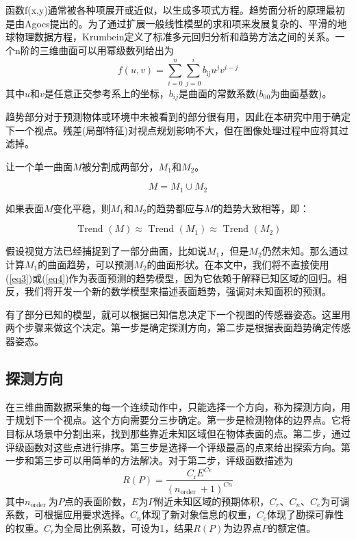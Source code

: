 \documentclass[AutoFakeBold,zihao=-4]{ctexart}
\begin{document}
	函数f(x,y)通常被各种项展开或近似，以生成多项式方程。趋势面分析的原理最初是由Agocs\cite{agocs1951least}提出的。为了通过扩展一般线性模型的求和项来发展复杂的、平滑的地球物理数据方程，Krumbein\cite{krumbein1959sorting}定义了标准多元回归分析和趋势方法之间的关系。一个n阶的三维曲面可以用幂级数列给出为
	\begin{equation}
		f(u, v)=\sum_{i=0}^{n} \sum_{j=0}^{i} b_{\mathrm{ij}} u^{j} v^{i-j}
		\label{eq4}
	\end{equation}
	其中$ u $和$ v $是任意正交参考系上的坐标，$ b_{ij} $是曲面的常数系数($ b_{00} $为曲面基数)。
	
	趋势部分对于预测物体或环境中未被看到的部分很有用，因此在本研究中用于确定下一个视点。残差(局部特征)对视点规划影响不大，但在图像处理过程中应将其过滤掉。
	
	让一个单一曲面$ M $被分割成两部分，$ M_{1} $和$ M_{2} $。
	
	\begin{equation*}
		M=M_{1} \cup M_{2}
	\end{equation*}

	如果表面$ M $变化平稳，则$ M_{1} $和$ M_{2} $的趋势都应与$ M $的趋势大致相等，即：
	
	\begin{equation}
		\text { Trend }(M) \approx \text { Trend }\left(M_{1}\right) \approx \text { Trend }\left(M_{2}\right)
		\label{eq5}
	\end{equation}

	假设视觉方法已经捕捉到了一部分曲面，比如说$ M_{1} $，但是$ M_{2} $仍然未知。那么通过计算$ M_{1} $的曲面趋势，可以预测$ M_{2} $的曲面形状。在本文中，我们将不直接使用(\ref{eq3})或(\ref{eq4})作为表面预测的趋势模型，因为它依赖于解释已知区域的回归。相反，我们将开发一个新的数学模型来描述表面趋势，强调对未知面积的预测。
	
	有了部分已知的模型，就可以根据已知信息决定下一个视图的传感器姿态。这里用两个步骤来做这个决定。第一步是确定探测方向，第二步是根据表面趋势确定传感器姿态。
	
	\subsection{探测方向}
	
	在三维曲面数据采集的每一个连续动作中，只能选择一个方向，称为探测方向，用于规划下一个视点。这个方向需要分三步确定。第一步是检测物体的边界点。它将目标从场景中分割出来，找到那些靠近未知区域但在物体表面的点。第二步，通过评级函数对这些点进行排序。第三步是选择一个评级最高的点来给出探索方向。第一步和第三步可以用简单的方法解决。对于第二步，评级函数描述为
	\begin{equation}
		R(P)=\frac{C_{\mathrm{r}} E^{C e}}{\left(n_{\text {order }}+1\right)^{C n}}
		\label{eq6}
	\end{equation}
	其中$ n_{\text {order }} $为$ P $点的表面阶数，$ E $为$ P $附近未知区域的预期体积，$ C_{r} $、$ C_{n} $、$ C_{e} $为可调系数，可根据应用要求选择。$ C_{n} $体现了新对象信息的权重，$ C_{e} $体现了勘探可靠性的权重。$ C_{r} $为全局比例系数，可设为1，结果$ R (P)$为边界点$ P $的额定值。
	
\end{document}
